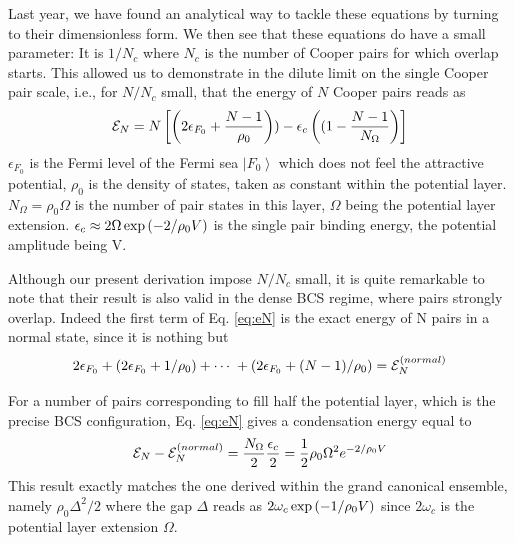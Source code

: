 \documentclass[aps,prb,amsmath,amssymb,preprint,superscriptaddress]{revtex4-1}
\newcommand{\efo}{\epsilon_{F_0}}
\begin{document}
Last year, we have found an analytical way to tackle these equations by turning to their dimensionless form.  We then see that these equations do have a small parameter: It is  $1/{N_c}$ where $N_c$ is the number of Cooper pairs for which overlap starts.  This allowed us to demonstrate in the dilute limit on the single Cooper pair scale, i.e., for $N/N_c$ small, that the energy of $N$ Cooper pairs reads as 
\begin{equation}\label{eq:eN}
\mathcal{E}_{N}=N\left[\left(2\epsilon_{F_0}+\frac{N-1}{\rho_0}\right))-\epsilon_c\left((1-\frac{N-1}{N_\Omega}\right)\right]
\end{equation}
$\epsilon_{F_0}$ is the Fermi level of the Fermi sea $\left\vert F_{0}\right\rangle$ which does not feel the attractive potential, $\rho_0$ is the density of states, taken as constant within the potential layer.  $N_\Omega=\rho_0\Omega$ is the number of pair states in this layer, $\Omega$ being the potential layer extension.  $\epsilon_c\approx2\Omega\exp\left(-2/\rho_0V\right)$ is the single pair binding energy, the potential amplitude being V. 

Although our present derivation impose $N/N_c$ small, it is quite remarkable to note that their result is also valid in the dense BCS regime, where pairs strongly overlap. Indeed the first term of Eq. \eqref{eq:eN} is the exact energy of N pairs in a normal state, since it is nothing but 
\begin{equation}
2\efo+\br{2\efo+1/\rho_0}+\cdots\;+\br{2\efo+(N-1)/\rho_0}=\mathcal{E}_{N}^{\text(normal)}
\end{equation} 

For a number of pairs corresponding to fill  half the potential layer, which is the precise BCS configuration, Eq. \eqref{eq:eN} gives a condensation energy equal to 
\begin{equation}
\mathcal{E}_{N}-\mathcal{E}_{N}^{\text(normal)}=\frac{N_\Omega}{2}\frac{\epsilon_c}{2}=\frac{1}{2}\rho_0\Omega^2e^{-2/\rho_0V}
\end{equation}
This result exactly matches the one derived within the grand canonical ensemble, namely $\rho_0\Delta^2/2$ where the gap $\Delta$ reads as $2\omega_c\exp\left(-1/\rho_0V\right)$ since $2\omega_c$ is the potential layer extension $\Omega$.
\end{document}
